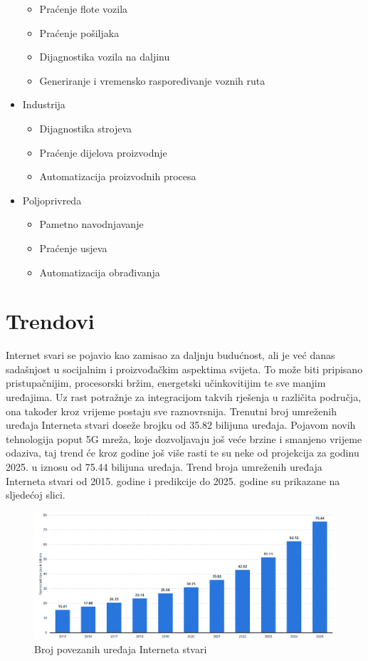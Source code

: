 \documentclass[times, utf8, diplomski]{fer}
\begin{document}
\begin{itemize}
    \begin{itemize}
        \item Praćenje flote vozila
        \item Praćenje pošiljaka
        \item Dijagnostika vozila na daljinu
        \item Generiranje i vremensko raspoređivanje voznih ruta
    \end{itemize}
    \item Industrija
    \begin{itemize}
        \item Dijagnostika strojeva
        \item Praćenje dijelova proizvodnje
        \item Automatizacija proizvodnih procesa
    \end{itemize}
    \item Poljoprivreda
    \begin{itemize}
        \item Pametno navodnjavanje
        \item Praćenje usjeva
        \item Automatizacija obrađivanja
    \end{itemize}
\end{itemize}

\section{Trendovi}
Internet svari se pojavio kao zamisao za daljnju budućnost, ali je već danas sadašnjost u socijalnim i proizvođačkim aspektima svijeta. To može biti pripisano pristupačnijim, procesorski bržim, energetski učinkovitijim te sve manjim uređajima. Uz rast potražnje za integracijom takvih rješenja u različita područja, ona također kroz vrijeme postaju sve raznovrsnija. Trenutni broj umreženih uređaja Interneta stvari doseže brojku od 35.82 bilijuna uređaja. Pojavom novih tehnologija poput 5G mreža, koje dozvoljavaju još veće brzine i smanjeno vrijeme odaziva, taj trend će kroz godine još više rasti te su neke od projekcija za godinu 2025. u iznosu od 75.44 bilijuna uređaja\citep{IotNumber}. Trend broja umreženih uređaja Interneta stvari od 2015. godine i predikcije do 2025. godine su prikazane na sljedećoj slici. 
\begin{figure}[H]
    \centering
    \includegraphics[width=14cm]{images/number-of-installed-iot.png}
    \caption{Broj povezanih uređaja Interneta stvari\citep{IotNumber}}
    \label{fig:iotdevices}
\end{figure}
\end{document}

